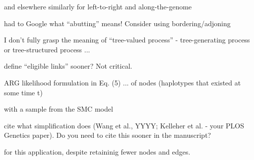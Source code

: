 
\begin{point}{\revref{} and elsewhere}
similarly for left-to-right and along-the-genome
\end{point}


\begin{point}{\revref} %
 had to Google what ``abutting'' means! Consider using bordering/adjoning
\end{point}


\begin{point}{\revref} %
 I don't fully grasp the meaning of ``tree-valued process'' - tree-generating process or tree-structured process ...
\end{point}

\reply{
}


\begin{point}{\revref} %
 define ``eligible links'' sooner? Not critical.
\end{point}

\reply{
}

\begin{point}{\revref} %
 ARG likelihood formulation in Eq. (5) ... of nodes (haplotypes that existed at some time t)
\end{point}

\reply{
}

\begin{point}{\revref} %
 with a sample from the SMC model
\end{point}

\reply{
}

\begin{point}{\revref} %
 cite what simplification does (Wang et al., YYYY; Kelleher et al. - your PLOS Genetics paper). Do you need to cite this sooner in the manuscript?
\end{point}

\reply{
}

\begin{point}{\revref} %
 for this application, despite retaininig fewer nodes and edges.
\end{point}

